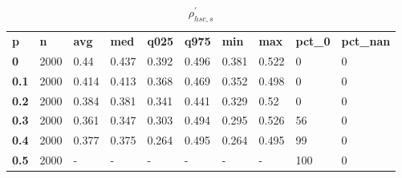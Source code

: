 \begin{table}[h]
 \centering 
\footnotesize
\caption{$\rho_{hsc,s}^\prime $}
\label{tab:alphahscs}
\begin{tabular}[h]{| l l l l l l l l l l|
    } \hline
\textbf{ p} & \textbf{ n} & \textbf{ avg} & \textbf{ med} & \textbf{ q025} & \textbf{ q975} & \textbf{ min} & \textbf{ max} & \textbf{ pct\_0} & \textbf{ pct\_nan}
           \\
  \textbf{  0} & 2000 &  0.44 & 0.437 & 0.392 & 0.496 & 0.381 & 0.522 &   0 & 0
           \\
  \textbf{0.1} & 2000 & 0.414 & 0.413 & 0.368 & 0.469 & 0.352 & 0.498 &   0 & 0
           \\
  \textbf{0.2} & 2000 & 0.384 & 0.381 & 0.341 & 0.441 & 0.329 &  0.52 &   0 & 0
           \\
  \textbf{0.3} & 2000 & 0.361 & 0.347 & 0.303 & 0.494 & 0.295 & 0.526 &  56 & 0
           \\
  \textbf{0.4} & 2000 & 0.377 & 0.375 & 0.264 & 0.495 & 0.264 & 0.495 &  99 & 0
           \\
  \textbf{0.5} & 2000 & - & - & - & - & - & - & 100 & 0
           \\
 \hline \end{tabular}
 \end{table}

